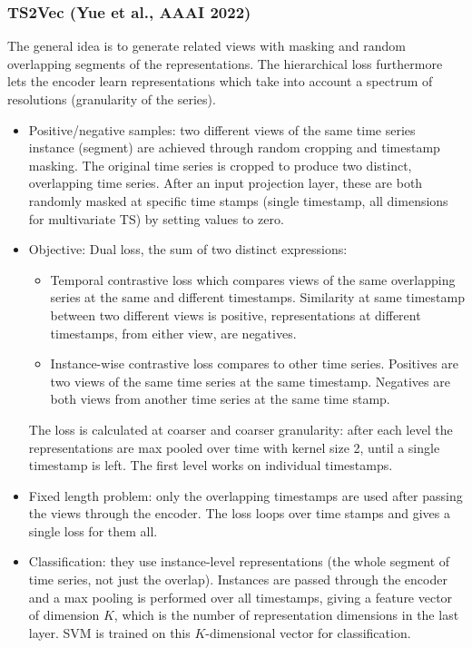 \documentclass[a4paper,11pt]{article}
\begin{document}
\subsubsection{TS2Vec (Yue et al., AAAI 2022)}
The general idea is to generate related views with masking and random overlapping segments of the representations. The hierarchical loss furthermore lets the encoder learn representations which take into account a spectrum of resolutions (granularity of the series).

\begin{itemize}
\item Positive/negative samples: two different views of the same time series instance (segment) are achieved through random cropping and timestamp masking. The original time series is cropped to produce two distinct, overlapping time series. After an input projection layer, these are both randomly masked at specific time stamps (single timestamp, all dimensions for multivariate TS) by setting values to zero.
\item Objective: Dual loss, the sum of two distinct expressions:
\begin{itemize}
\item Temporal contrastive loss which compares views of the same overlapping series at the same and different timestamps. Similarity at same timestamp between two different views is positive, representations at different timestamps, from either view, are negatives.
\item Instance-wise contrastive loss compares to other time series. Positives are two views of the same time series at the same timestamp. Negatives are both views from another time series at the same time stamp.
\end{itemize}
The loss is calculated at coarser and coarser granularity: after each level the representations are max pooled over time with kernel size 2, until a single timestamp is left. The first level works on individual timestamps.
\item Fixed length problem: only the overlapping timestamps are used after passing the views through the encoder. The loss loops over time stamps and gives a single loss for them all.
\item Classification: they use instance-level representations (the whole segment of time series, not just the overlap). Instances are passed through the encoder and a max pooling is performed over all timestamps, giving a feature vector of dimension $K$, which is the number of representation dimensions in the last layer. SVM is trained on this $K$-dimensional vector for classification.
\end{itemize}
\end{document}
